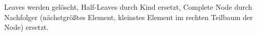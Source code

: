 \documentclass[
../../AuD-Zusammenfassung.tex,
]
{subfiles}
\begin{document}
Leaves werden gelöscht, Half-Leaves durch Kind ersetzt, Complete Node durch Nachfolger (nächstgrößtes Element, kleinstes Element im rechten Teilbaum der Node) ersetzt.
\newpage


\end{document}
